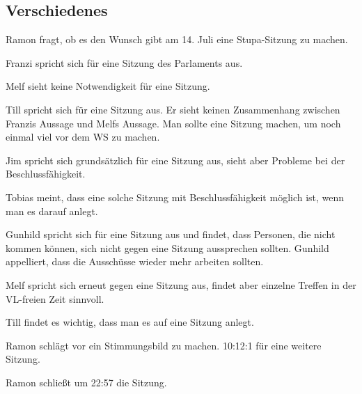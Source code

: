 \documentclass[ngerman,headheight=70pt]{scrartcl}
\begin{document}
    \subsection{Verschiedenes}

    Ramon fragt, ob es den Wunsch gibt am 14. Juli eine Stupa-Sitzung zu machen.

    Franzi spricht sich für eine Sitzung des Parlaments aus.

    Melf sieht keine Notwendigkeit für eine Sitzung.

    Till spricht sich für eine Sitzung aus. Er sieht keinen Zusammenhang
    zwischen Franzis Aussage und Melfs Aussage. Man sollte eine Sitzung machen,
    um noch einmal viel vor dem WS zu machen.

    Jim spricht sich grundsätzlich für eine Sitzung aus, sieht aber Probleme
    bei der Beschlussfähigkeit.

    Tobias meint, dass eine solche Sitzung mit Beschlussfähigkeit möglich ist,
    wenn man es darauf anlegt.

    Gunhild spricht sich für eine Sitzung aus und findet, dass Personen, die nicht
    kommen können, sich nicht gegen eine Sitzung aussprechen sollten.
    Gunhild appelliert, dass die Ausschüsse wieder mehr arbeiten sollten.

    Melf spricht sich erneut gegen eine Sitzung aus, findet aber einzelne
    Treffen in der VL-freien Zeit sinnvoll.

    Till findet es wichtig, dass man es auf eine Sitzung anlegt.

    Ramon schlägt vor ein Stimmungsbild zu machen. 10:12:1 für eine weitere Sitzung.

    Ramon schließt um 22:57 die Sitzung.
\end{document}
